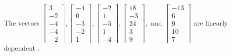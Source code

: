 \begin{exercise}
\begin{exerciseStatement}
  \end{exerciseStatement}
  \begin{exerciseAnswer}
   The vectors \(\left[\begin{array}{r}
3 \\
-2 \\
-4 \\
-4 \\
-2
\end{array}\right] , \left[\begin{array}{r}
-4 \\
0 \\
-3 \\
-2 \\
1
\end{array}\right] , \left[\begin{array}{r}
-2 \\
1 \\
-5 \\
1 \\
-4
\end{array}\right] , \left[\begin{array}{r}
18 \\
-3 \\
24 \\
3 \\
9
\end{array}\right] , \text{ and } \left[\begin{array}{r}
-13 \\
6 \\
9 \\
10 \\
7
\end{array}\right]\) are 
  	 linearly dependent  .
  


  \end{exerciseAnswer}
\end{exercise}